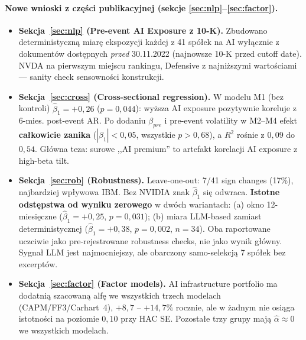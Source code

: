 \documentclass[11pt,a4paper]{article}
\begin{document}
\paragraph{Nowe wnioski z części publikacyjnej (sekcje \ref{sec:nlp}--\ref{sec:factor}).}
\begin{itemize}
  \item \textbf{Sekcja~\ref{sec:nlp} (Pre-event AI Exposure z 10-K).}
        Zbudowano deterministyczną miarę ekspozycji każdej z 41 spółek na AI
        wyłącznie z dokumentów dostępnych \emph{przed} 30.11.2022 (najnowsze
        10-K przed cutoff date). NVDA na pierwszym miejscu rankingu, Defensive
        z najniższymi wartościami --- sanity check sensowności konstrukcji.
  \item \textbf{Sekcja~\ref{sec:cross} (Cross-sectional regression).}
        W modelu M1 (bez kontroli) $\hat\beta_1 = +0{,}26$ ($p=0{,}044$):
        wyższa AI exposure pozytywnie koreluje z 6-mies. post-event AR.
        Po dodaniu $\beta_{pre}$ i pre-event volatility w M2--M4 efekt
        \textbf{całkowicie zanika} ($|\hat\beta_1| < 0{,}05$, wszystkie $p > 0{,}68$),
        a $R^2$ rośnie z $0{,}09$ do $0{,}54$. Główna teza: surowe ,,AI premium''
        to artefakt korelacji AI exposure z high-beta tilt.
  \item \textbf{Sekcja~\ref{sec:rob} (Robustness).} Leave-one-out: 7/41
        sign changes (17\%), najbardziej wpływowa IBM. Bez NVIDIA znak
        $\hat\beta_1$ się odwraca. \textbf{Istotne odstępstwa od wyniku zerowego}
        w dwóch wariantach: (a) okno 12-miesięczne ($\hat\beta_1=+0{,}25$,
        $p=0{,}031$); (b) miara LLM-based zamiast deterministycznej
        ($\hat\beta_1=+0{,}38$, $p=0{,}002$, $n=34$). Oba raportowane uczciwie
        jako pre-rejestrowane robustness checks, nie jako wynik główny.
        Sygnał LLM jest najmocniejszy, ale obarczony samo-selekcją 7 spółek
        bez excerptów.
  \item \textbf{Sekcja~\ref{sec:factor} (Factor models).} AI infrastructure
        portfolio ma dodatnią szacowaną alfę we wszystkich trzech modelach
        (CAPM/FF3/Carhart~4), $+8{,}7$ -- $+14{,}7\%$ rocznie, ale w żadnym
        nie osiąga istotności na poziomie $0{,}10$ przy HAC SE. Pozostałe trzy
        grupy mają $\hat\alpha \approx 0$ we wszystkich modelach.
\end{itemize}
\end{document}
